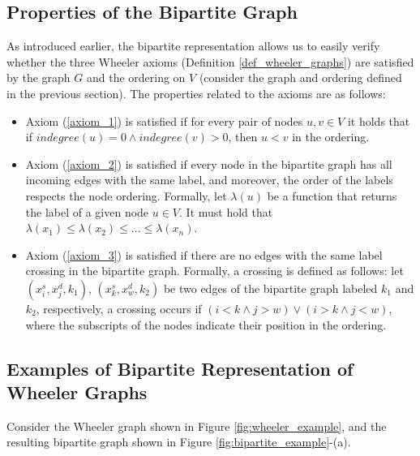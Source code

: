 \subsection{Properties of the Bipartite Graph}
As introduced earlier, the bipartite representation allows us to easily verify whether the three Wheeler axioms (Definition \ref{def_wheeler_graphs}) are satisfied by the graph $G$ and the ordering on $V$ (consider the graph and ordering defined in the previous section). The properties related to the axioms are as follows:
\begin{itemize}
    \item Axiom (\ref{axiom_1}) is satisfied if for every pair of nodes $u, v \in V$ it holds that if $indegree(u) = 0 \wedge indegree(v) > 0$, then $u < v$ in the ordering.
    \item Axiom (\ref{axiom_2}) is satisfied if every node in the bipartite graph has all incoming edges with the same label, and moreover, the order of the labels respects the node ordering. Formally, let $\lambda(u)$ be a function that returns the label of a given node $u \in V$. It must hold that $\lambda(x_1) \leq \lambda(x_2) \leq \dots \leq \lambda(x_n)$.
    \item Axiom (\ref{axiom_3}) is satisfied if there are no edges with the same label crossing in the bipartite graph. Formally, a crossing is defined as follows: let $(x_i^s,x_j^d,k_1)$, $(x_k^s,x_w^d,k_2)$ be two edges of the bipartite graph labeled $k_1$ and $k_2$, respectively, a crossing occurs if $(i < k \wedge j > w) \lor (i > k \wedge j < w)$, where the subscripts of the nodes indicate their position in the ordering.
\end{itemize}

\begingroup
\sloppy
\raggedright
\subsection{Examples of Bipartite Representation of Wheeler Graphs}
\endgroup
Consider the Wheeler graph shown in Figure \ref{fig:wheeler_example}, and the resulting bipartite graph shown in Figure \ref{fig:bipartite_example}-(a).

